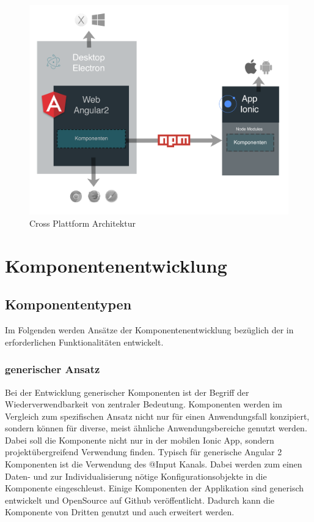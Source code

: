 \begin{figure}[h]
 \centering
 \includegraphics[width=\linewidth]{kapitel4/arch.png}
 \caption{Cross Plattform Architektur}
 \label{kapitel4/arch}
\end{figure}
\vspace{0.3cm}



\section{Komponentenentwicklung}

\subsection{Komponententypen}

Im Folgenden werden Ansätze der Komponentenentwicklung bezüglich der in
\projectname{} erforderlichen Funktionalitäten entwickelt.


\subsubsection{generischer Ansatz}

Bei der Entwicklung generischer Komponenten ist der Begriff der Wiederverwendbarkeit von zentraler Bedeutung.
Komponenten werden im Vergleich zum spezifischen Ansatz nicht nur für einen Anwendungsfall konzipiert, sondern können
für diverse, meist ähnliche Anwendungsbereiche genutzt werden. Dabei soll die Komponente nicht nur in der mobilen Ionic App,
sondern projektübergreifend Verwendung finden.
Typisch für generische Angular 2 Komponenten ist die Verwendung des @Input Kanals.
Dabei werden zum einen Daten- und zur Individualisierung nötige Konfigurationsobjekte in die Komponente eingeschleust.
Einige Komponenten der Applikation \projectname{} sind
generisch entwickelt und OpenSource auf Github veröffentlicht.
Dadurch kann die Komponente von Dritten genutzt und auch erweitert werden.



